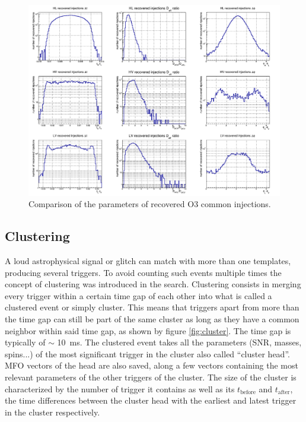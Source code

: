 \begin{figure}
  \centering
  \includegraphics[width=\linewidth]{sectionMBTA/cRecovInj.png}
  \caption{Comparison of the parameters of recovered O3 common injections.}
  \label{fig:pct_inj_recov}
\end{figure}



\subsection{Clustering}
\label{sec:clustering}

A loud astrophysical signal or glitch can match with more than one templates, producing several triggers.
To avoid counting such events multiple times the concept of clustering was introduced in the search.
Clustering consists in merging every trigger within a certain time gap of each other into what is called a clustered event or simply cluster.
This means that triggers apart from more than the time gap can still be part of the same cluster as long as they have a common neighbor within said time gap, as shown by figure \ref{fig:cluster}.
The time gap is typically of $\sim$ \SI{10}{\milli\second}.
The clustered event takes all the parameters (SNR, masses, spins...) of the most significant trigger in the cluster also called ``cluster head''.
MFO vectors of the head are also saved, along a few vectors containing the most relevant parameters of the other triggers of the cluster.
The size of the cluster is characterized by the number of trigger it contains as well as its $t_{\textrm{before}}$ and $t_{\textrm{after}}$, the time differences between the cluster head with the earliest and latest trigger in the cluster respectively.



